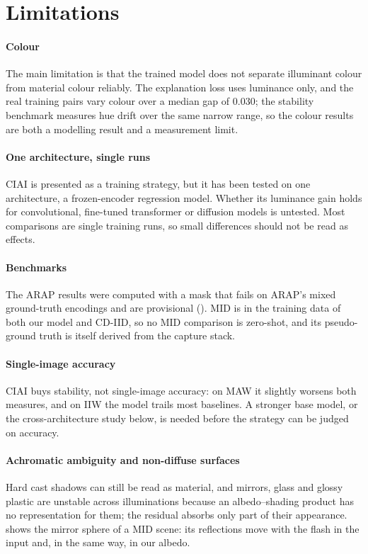 \section{Limitations}

\paragraph{Colour}
The main limitation is that the trained model does not separate illuminant colour from
material colour reliably. The explanation loss uses luminance only, and the real training
pairs vary colour over a median gap of $0.030$; the stability benchmark measures hue drift
over the same narrow range, so the colour results are both a modelling result and a
measurement limit.

\paragraph{One architecture, single runs}
CIAI is presented as a training strategy, but it has been tested on one architecture, a
frozen-encoder regression model. Whether its luminance gain holds for convolutional,
fine-tuned transformer or diffusion models is untested. Most comparisons are single
training runs, so small differences should not be read as effects.

\paragraph{Benchmarks}
The ARAP results were computed with a mask that fails on ARAP's mixed ground-truth
encodings and are provisional (). MID is in the training data of
both our model and CD-IID, so no MID comparison is zero-shot, and its pseudo-ground truth
is itself derived from the capture stack.

\paragraph{Single-image accuracy}
CIAI buys stability, not single-image accuracy: on MAW it slightly worsens both measures,
and on IIW the model trails most baselines. A stronger base model, or the cross-architecture
study below, is needed before the strategy can be judged on accuracy.

\paragraph{Achromatic ambiguity and non-diffuse surfaces}
Hard cast shadows can still be read as material, and mirrors, glass and glossy plastic are
unstable across illuminations because an albedo--shading product has no representation for
them; the residual absorbs only part of their appearance.  shows
the mirror sphere of a MID scene: its reflections move with the flash in the input and, in the
same way, in our albedo.

